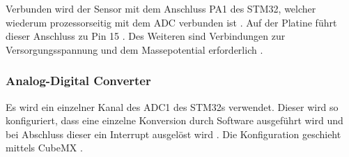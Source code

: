Verbunden wird der Sensor mit dem Anschluss PA1 des STM32, welcher wiederum prozessorseitig mit dem \ac{ADC} verbunden ist \citep{STM32_Datasheet}. Auf der Platine führt
dieser Anschluss zu Pin 15 \citep{IoTGateway}. Des Weiteren sind Verbindungen zur Versorgungsspannung und dem Massepotential erforderlich \citep{Sensor}.



\subsubsection{Analog-Digital Converter}

Es wird ein einzelner Kanal des ADC1 des STM32s verwendet. Dieser wird so konfiguriert, dass eine einzelne Konversion durch Software ausgeführt wird und bei Abschluss
dieser ein Interrupt ausgelöst wird \citep{STM32_Ref}. Die Konfiguration geschieht mittels CubeMX \citep{CubeMX}.

